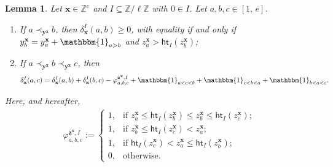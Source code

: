 \documentclass[11pt,a4paper,reqno]{amsart}
\numberwithin{equation}{section}
\theoremstyle{plain}
\newtheorem{lem}[thm]{Lemma}
\theoremstyle{definition}
\theoremstyle{remark}
\numberwithin{equation}{section}
\newcommand{\bbone}{\mathbbm{1}}
\newcommand{\bx}{\mathbf{x}}
\newcommand{\by}{\mathbf{y}}
\newcommand{\bz}{\mathbf{z}}
\newcommand{\ZZ}{\mathbb{Z}}
\newcommand{\ff}{\varphi}
\newcommand{\Ht}{\mathsf{ht}}
\begin{document}
\begin{lem} \label{L:delta-basic}
Let $\bx \in \ZZ^e$ and $I \subseteq \ZZ/\ell\ZZ$ with $0 \in I$.
Let $a,b,c \in [1,\,e]$.
\begin{enumerate}
\item If $a \prec_{\by^\bx} b$, then $\delta_{\bx}^I(a,b) \geq 0$, with equality if and only if $y^{\bx}_{b} = y^{\bx}_{a} + \bbone_{a > b}$ and $z^{\bx}_{a} > \Ht_I(z^{\bx}_{b})$;

\item If $a \prec_{\by^\bx} b \prec_{\by^\bx} c$, then
$$\delta_{\bx}^I(a,c) = \delta_{\bx}^I(a,b) + \delta_{\bx}^I(b,c) - \ff^{\bz^{\bx},I}_{a,b,c} + \bbone_{a < c < b} + \bbone_{c < b < a} + \bbone_{b < a < c}.
$$
\end{enumerate}
Here, and hereafter, %
\begin{align*}
\ff^{\bz^{\bx},I}_{a,b,c}
:= \begin{cases}
1, &\text{if } z^{\bx}_{a} \leq \Ht_I(z^{\bx}_b) \leq z^{\bx}_{b} \leq \Ht_I(z^{\bx}_{c}); \\
1, &\text{if } z^{\bx}_{b} \leq \Ht_I(z^{\bx}_{c}) < z^{\bx}_{a}; \\
1, &\text{if } \Ht_I(z^{\bx}_{c}) < z^{\bx}_{a} \leq \Ht_I(z^{\bx}_{b});\\
0, &\text{otherwise}.
\end{cases}
\end{align*}
\end{lem}
\end{document}
